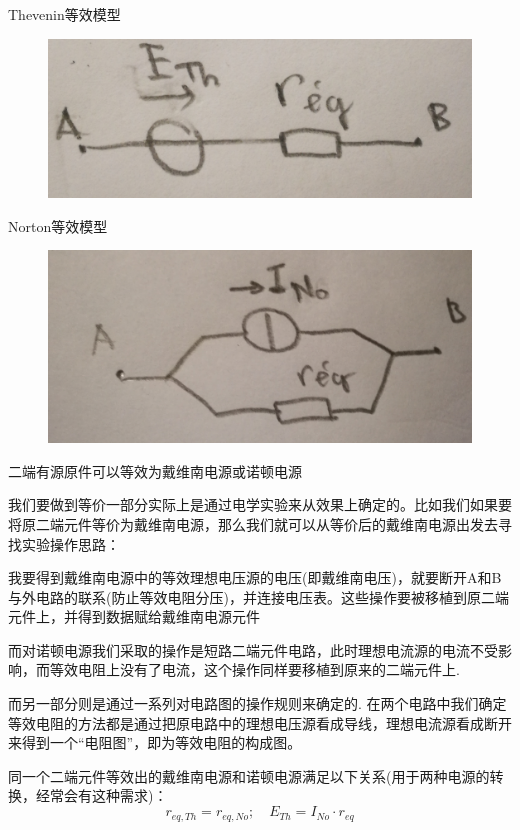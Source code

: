 \documentclass[12pt]{book}
\theoremstyle{definition}\newtheorem{dfn}{Définition}[chapter]
\theoremstyle{plain}\newtheorem{thm}{Théorème}[chapter]
\theoremstyle{plain}\newtheorem{prp}{Proposition}[chapter]
\theoremstyle{plain}\newtheorem{lem}{\bf Lemme}[chapter]
\theoremstyle{plain}\newtheorem{axm}{\bf Axiome}[chapter]
\theoremstyle{plain}\newtheorem{lmm}{\bf Lemme}[chapter]
\theoremstyle{plain}\newtheorem{cor}{\bf Corollaire}[chapter]
\theoremstyle{remark}\newtheorem{rem}{Remarque}[chapter]
\begin{document}
Thevenin等效模型
\begin{figure}[H]
	\centering
	\includegraphics[scale=0.1]{image//Electrocinetique cadre et concepts de base//1}
\end{figure}
Norton等效模型
\begin{figure}[H]
	\centering
	\includegraphics[scale=0.1]{image//Electrocinetique cadre et concepts de base//2}
\end{figure}


{\color{red} 二端有源原件可以等效为戴维南电源或诺顿电源} 

我们要做到等价一部分实际上是通过电学实验来从效果上确定的。比如我们如果要将原二端元件等价为戴维南电源，那么我们就可以从等价后的戴维南电源出发去寻找实验操作思路：

我要得到戴维南电源中的等效理想电压源的电压(即戴维南电压)，就要断开A和B与外电路的联系(防止等效电阻分压)，并连接电压表。这些操作要被移植到原二端元件上，并得到数据赋给戴维南电源元件

而对诺顿电源我们采取的操作是短路二端元件电路，此时理想电流源的电流不受影响，而等效电阻上没有了电流，这个操作同样要移植到原来的二端元件上.

而另一部分则是通过一系列对电路图的操作规则来确定的.%
在两个电路中我们确定等效电阻的方法都是通过把原电路中的理想电压源看成导线，理想电流源看成断开来得到一个“电阻图”，即为等效电阻的构成图。

{\color{red} 同一个二端元件等效出的戴维南电源和诺顿电源满足以下关系(用于两种电源的转换，经常会有这种需求)：
$$r_{eq,Th}=r_{eq,No};\quad E_{Th}=I_{No}\cdot r_{eq}$$ } 
\end{document}
